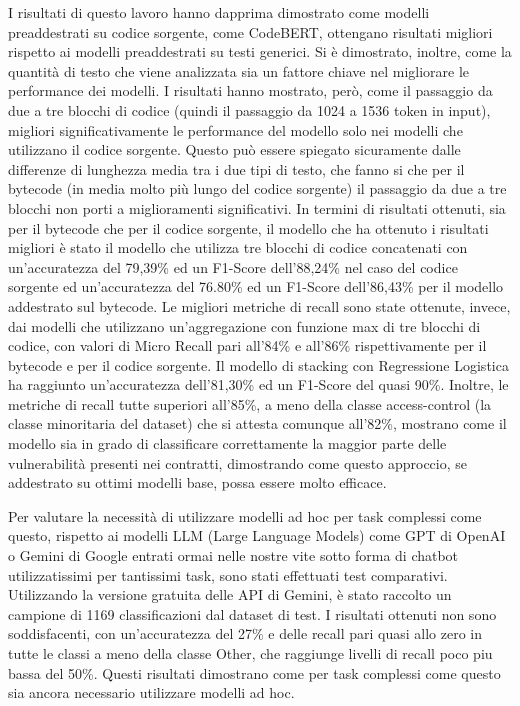 \documentclass[../../Thesis.tex]{subfiles}
\begin{document}
I risultati di questo lavoro hanno dapprima dimostrato come modelli preaddestrati su codice sorgente, come CodeBERT, ottengano risultati migliori rispetto ai modelli preaddestrati su testi generici. Si \`e dimostrato, inoltre, come la quantit\`a di testo che viene analizzata sia un fattore chiave nel migliorare le performance dei modelli. I risultati hanno mostrato, per\`o, come il passaggio da due a tre blocchi di codice (quindi il passaggio da 1024 a 1536 token in input), migliori significativamente le performance del modello solo nei modelli che utilizzano il codice sorgente. Questo pu\`o essere spiegato sicuramente dalle differenze di lunghezza media tra i due tipi di testo, che fanno si che per il bytecode (in media molto pi\`u lungo del codice sorgente) il passaggio da due a tre blocchi non porti a miglioramenti significativi. 
In termini di risultati ottenuti, sia per il bytecode che per il codice sorgente, il modello che ha ottenuto i risultati migliori \`e stato il modello che utilizza tre blocchi di codice concatenati con un'accuratezza del 79,39\% ed un F1-Score dell'88,24\% nel caso del codice sorgente ed un'accuratezza del 76.80\% ed un F1-Score dell'86,43\% per il modello addestrato sul bytecode. Le migliori metriche di recall sono state ottenute, invece, dai modelli che utilizzano  un'aggregazione con funzione max di tre blocchi di codice, con valori di Micro Recall pari all'84\% e all'86\% rispettivamente per il bytecode e per il codice sorgente.
Il modello di stacking con Regressione Logistica ha raggiunto un'accuratezza dell'81,30\% ed un F1-Score del quasi 90\%. Inoltre, le metriche di recall tutte superiori all'85\%, a meno della classe access-control (la classe minoritaria del dataset) che si attesta comunque all'82\%, mostrano come il modello sia in grado di classificare correttamente la maggior parte delle vulnerabilit\`a presenti nei contratti, dimostrando come questo approccio, se addestrato su ottimi modelli base, possa essere molto efficace.

Per valutare la necessit\`a di utilizzare modelli ad hoc per task complessi come questo, rispetto ai modelli LLM (Large Language Models) come GPT di OpenAI o Gemini di Google entrati ormai nelle nostre vite sotto forma di chatbot utilizzatissimi per tantissimi task, sono stati effettuati test comparativi. Utilizzando la versione gratuita delle API di Gemini, \`e stato raccolto un campione di 1169 classificazioni dal dataset di test. I risultati ottenuti non sono soddisfacenti, con un'accuratezza del 27\% e delle recall pari quasi allo zero in tutte le classi a meno della classe Other, che raggiunge livelli di recall poco piu bassa del 50\%. Questi risultati dimostrano come per task complessi come questo sia ancora necessario utilizzare modelli ad hoc.
\end{document}
